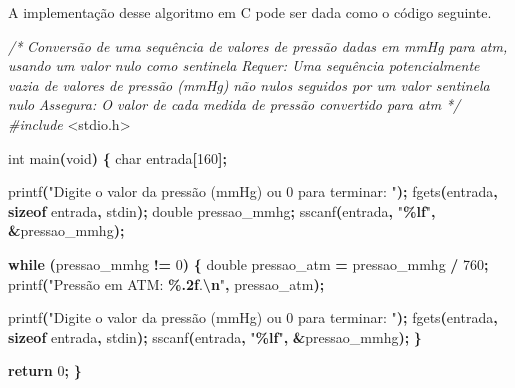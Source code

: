 \documentclass[
  11pt,
  a4paper,
]{scrbook}
\newenvironment{Shaded}{\begin{snugshade}}{\end{snugshade}}
\newcommand{\CommentTok}[1]{\textcolor[rgb]{0.56,0.35,0.01}{\textit{#1}}}
\newcommand{\ControlFlowTok}[1]{\textcolor[rgb]{0.13,0.29,0.53}{\textbf{#1}}}
\newcommand{\DataTypeTok}[1]{\textcolor[rgb]{0.13,0.29,0.53}{#1}}
\newcommand{\DecValTok}[1]{\textcolor[rgb]{0.00,0.00,0.81}{#1}}
\newcommand{\ImportTok}[1]{#1}
\newcommand{\KeywordTok}[1]{\textcolor[rgb]{0.13,0.29,0.53}{\textbf{#1}}}
\newcommand{\NormalTok}[1]{#1}
\newcommand{\OperatorTok}[1]{\textcolor[rgb]{0.81,0.36,0.00}{\textbf{#1}}}
\newcommand{\PreprocessorTok}[1]{\textcolor[rgb]{0.56,0.35,0.01}{\textit{#1}}}
\newcommand{\SpecialCharTok}[1]{\textcolor[rgb]{0.81,0.36,0.00}{\textbf{#1}}}
\newcommand{\StringTok}[1]{\textcolor[rgb]{0.31,0.60,0.02}{#1}}
\begin{document}
A implementação desse algoritmo em C pode ser dada como o código
seguinte.

\begin{Shaded}
\begin{Highlighting}[]
\CommentTok{/*}
\CommentTok{Conversão de uma sequência de valores de pressão dadas em mmHg para atm,}
\CommentTok{    usando um valor nulo como sentinela}
\CommentTok{Requer: Uma sequência potencialmente vazia de valores de pressão (mmHg)}
\CommentTok{    não nulos seguidos por um valor sentinela nulo}
\CommentTok{Assegura: O valor de cada medida de pressão convertido para atm}
\CommentTok{*/}
\PreprocessorTok{\#include }\ImportTok{\textless{}stdio.h\textgreater{}}

\DataTypeTok{int}\NormalTok{ main}\OperatorTok{(}\DataTypeTok{void}\OperatorTok{)} \OperatorTok{\{}
    \DataTypeTok{char}\NormalTok{ entrada}\OperatorTok{[}\DecValTok{160}\OperatorTok{];}

\NormalTok{    printf}\OperatorTok{(}\StringTok{"Digite o valor da pressão (mmHg) ou 0 para terminar: "}\OperatorTok{);}
\NormalTok{    fgets}\OperatorTok{(}\NormalTok{entrada}\OperatorTok{,} \KeywordTok{sizeof}\NormalTok{ entrada}\OperatorTok{,}\NormalTok{ stdin}\OperatorTok{);}
    \DataTypeTok{double}\NormalTok{ pressao\_mmhg}\OperatorTok{;}
\NormalTok{    sscanf}\OperatorTok{(}\NormalTok{entrada}\OperatorTok{,} \StringTok{"}\SpecialCharTok{\%lf}\StringTok{"}\OperatorTok{,} \OperatorTok{\&}\NormalTok{pressao\_mmhg}\OperatorTok{);}

    \ControlFlowTok{while} \OperatorTok{(}\NormalTok{pressao\_mmhg }\OperatorTok{!=} \DecValTok{0}\OperatorTok{)} \OperatorTok{\{}
        \DataTypeTok{double}\NormalTok{ pressao\_atm }\OperatorTok{=}\NormalTok{ pressao\_mmhg }\OperatorTok{/} \DecValTok{760}\OperatorTok{;}
\NormalTok{        printf}\OperatorTok{(}\StringTok{"Pressão em ATM: }\SpecialCharTok{\%.2f}\StringTok{.}\SpecialCharTok{\textbackslash{}n}\StringTok{"}\OperatorTok{,}\NormalTok{ pressao\_atm}\OperatorTok{);}

\NormalTok{        printf}\OperatorTok{(}\StringTok{"Digite o valor da pressão (mmHg) ou 0 para terminar: "}\OperatorTok{);}
\NormalTok{        fgets}\OperatorTok{(}\NormalTok{entrada}\OperatorTok{,} \KeywordTok{sizeof}\NormalTok{ entrada}\OperatorTok{,}\NormalTok{ stdin}\OperatorTok{);}
\NormalTok{        sscanf}\OperatorTok{(}\NormalTok{entrada}\OperatorTok{,} \StringTok{"}\SpecialCharTok{\%lf}\StringTok{"}\OperatorTok{,} \OperatorTok{\&}\NormalTok{pressao\_mmhg}\OperatorTok{);}
    \OperatorTok{\}}

    \ControlFlowTok{return} \DecValTok{0}\OperatorTok{;}
\OperatorTok{\}}
\end{Highlighting}
\end{Shaded}
\end{document}
